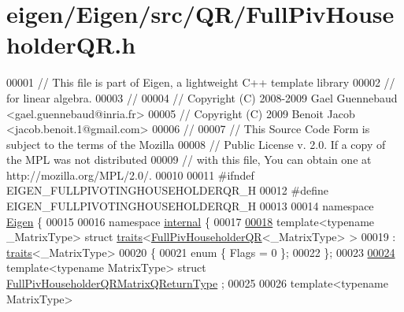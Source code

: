 \hypertarget{eigen_2_eigen_2src_2_q_r_2_full_piv_householder_q_r_8h_source}{}\section{eigen/\+Eigen/src/\+Q\+R/\+Full\+Piv\+Householder\+QR.h}
\label{eigen_2_eigen_2src_2_q_r_2_full_piv_householder_q_r_8h_source}

\begin{DoxyCode}
00001 \textcolor{comment}{// This file is part of Eigen, a lightweight C++ template library}
00002 \textcolor{comment}{// for linear algebra.}
00003 \textcolor{comment}{//}
00004 \textcolor{comment}{// Copyright (C) 2008-2009 Gael Guennebaud <gael.guennebaud@inria.fr>}
00005 \textcolor{comment}{// Copyright (C) 2009 Benoit Jacob <jacob.benoit.1@gmail.com>}
00006 \textcolor{comment}{//}
00007 \textcolor{comment}{// This Source Code Form is subject to the terms of the Mozilla}
00008 \textcolor{comment}{// Public License v. 2.0. If a copy of the MPL was not distributed}
00009 \textcolor{comment}{// with this file, You can obtain one at http://mozilla.org/MPL/2.0/.}
00010 
00011 \textcolor{preprocessor}{#ifndef EIGEN\_FULLPIVOTINGHOUSEHOLDERQR\_H}
00012 \textcolor{preprocessor}{#define EIGEN\_FULLPIVOTINGHOUSEHOLDERQR\_H}
00013 
00014 \textcolor{keyword}{namespace }\hyperlink{namespace_eigen}{Eigen} \{ 
00015 
00016 \textcolor{keyword}{namespace }\hyperlink{namespaceinternal}{internal} \{
00017 
\hyperlink{struct_eigen_1_1internal_1_1traits_3_01_full_piv_householder_q_r_3_01___matrix_type_01_4_01_4}{00018} \textcolor{keyword}{template}<\textcolor{keyword}{typename} \_MatrixType> \textcolor{keyword}{struct }\hyperlink{struct_eigen_1_1internal_1_1traits}{traits}<\hyperlink{group___q_r___module_class_eigen_1_1_full_piv_householder_q_r}{FullPivHouseholderQR}<\_MatrixType> >
00019  : \hyperlink{struct_eigen_1_1internal_1_1traits}{traits}<\_MatrixType>
00020 \{
00021   \textcolor{keyword}{enum} \{ Flags = 0 \};
00022 \};
00023 
\hyperlink{group___q_r___module}{00024} \textcolor{keyword}{template}<\textcolor{keyword}{typename} MatrixType> \textcolor{keyword}{struct }\hyperlink{group___q_r___module_struct_eigen_1_1internal_1_1_full_piv_householder_q_r_matrix_q_return_type}{FullPivHouseholderQRMatrixQReturnType}
      ;
00025 
00026 \textcolor{keyword}{template}<\textcolor{keyword}{typename} MatrixType>

\end{DoxyCode}

